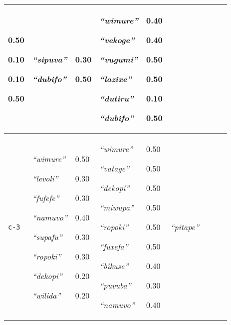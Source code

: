 {\begin{tabular}{@{}p{1.2cm}|p{1.6cm}@{}p{0.8cm}@{}|p{1.6cm}@{}p{0.8cm}@{}|p{1.6cm}@{}p{0.8cm}@{}|p{1.6cm}@{}p{0.8cm}@{}}
0.50

0.10

0.10

0.50&\textit{``sipuva''}


\textit{``dubifo''}
&0.30

0.50&\textit{``wimure''}


\textit{``vekoge''}


\textit{``vugumi''}


\textit{``lazixe''}


\textit{``dutiru''}


\textit{``dubifo''}
&0.40

0.40

0.50

0.50

0.10

0.50\\
\hline
\texttt{c-3}&\textit{``wimure''}


\textit{``levoli''}


\textit{``fufefe''}


\textit{``namuvo''}


\textit{``supafu''}


\textit{``ropoki''}


\textit{``dekopi''}


\textit{``wilida''}
&0.50

0.30

0.30

0.40

0.30

0.30

0.20

0.20&\textit{``wimure''}


\textit{``vatage''}


\textit{``dekopi''}


\textit{``miwupa''}


\textit{``ropoki''}


\textit{``fuxefa''}


\textit{``bikuse''}


\textit{``puvuba''}


\textit{``namuvo''}
&0.50

0.50

0.50

0.50

0.50

0.50

0.40

0.30

0.40&\textit{``pitape''}



\end{tabular}}
